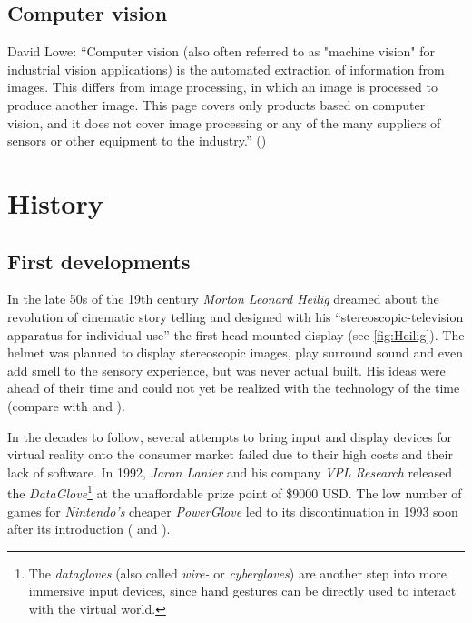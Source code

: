 \subsection{Computer vision}\label{ssec:cv}
 

David Lowe: \enquote{Computer vision (also often referred to as "machine vision" for industrial vision applications) is the automated extraction of information from images. This differs from image processing, in which an image is processed to produce another image. This page covers only products based on computer vision, and it does not cover image processing or any of the many suppliers of sensors or other equipment to the industry.} (\cite{Lowe.2016})

\section{History}\label{sec:history}
\subsection{First developments}
In the late 50s of the 19th century \textit{Morton Leonard Heilig} dreamed about the revolution of cinematic story telling and designed with his \enquote{stereoscopic-television apparatus for individual use} the first head-mounted display (see \autoref{fig:Heilig}). The helmet was planned to display stereoscopic images, play surround sound and even add smell to the sensory experience, but was never actual built. His ideas were ahead of their time and could not yet be realized with the technology of the time (compare with \cite[p.3]{Toennis.2010} and \cite[p.4 et seq.]{Burdea.2003}). 

In the decades to follow, several attempts to bring input and display devices for virtual reality onto the consumer market failed due to their high costs and their lack of software. In 1992, \textit{Jaron Lanier} and his company \textit{VPL Research} released the \textit{DataGlove}\footnote{The \textit{datagloves} (also called \textit{wire-} or \textit{cybergloves}) are another step into more immersive input devices, since hand gestures can be directly used to interact with the virtual world.} at the unaffordable prize point of \$9000 USD. The low number of games for \textit{Nintendo's} cheaper \textit{PowerGlove} led to its discontinuation in 1993 soon after its introduction (\cite[p.8 et seq.]{Burdea.2003} and \cite[p.19 et seq.]{Doerner.2013}).

